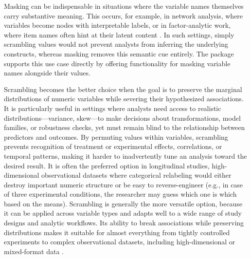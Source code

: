 Masking can be indispensable in situations where the variable names themselves carry substantive meaning. This occurs, for example, in network analysis, where variables become nodes with interpretable labels, or in factor-analytic work, where item names often hint at their latent content \citep{Hoekstra2025-ub}. In such settings, simply scrambling values would not prevent analysts from inferring the underlying constructs, whereas masking removes this semantic cue entirely. The  package supports this use case directly by offering functionality for masking variable names alongside their values.

Scrambling becomes the better choice when the goal is to preserve the marginal distributions of numeric variables while severing their hypothesized associations. It is particularly useful in settings where analysts need access to realistic distributions---variance, skew---to make decisions about transformations, model families, or robustness checks, yet must remain blind to the relationship between predictors and outcomes. By permuting values within variables, scrambling prevents recognition of treatment or experimental effects, correlations, or temporal patterns, making it harder to inadvertently tune an analysis toward the desired result. It is often the preferred option in longitudinal studies, high-dimensional observational datasets where categorical relabeling would either destroy important numeric structure or be easy to reverse-engineer (e.g., in case of three experimental conditions, the researcher may guess which one is which based on the means). Scrambling is generally the more versatile option, because it can be applied across variable types and adapts well to a wide range of study designs and analytic workflows. Its ability to break associations while preserving distributions makes it suitable for almost everything from tightly controlled experiments to complex observational datasets, including high-dimensional or mixed-format data \citep{Sarafoglou2025-fr, Sarafoglou2023-rf}.

